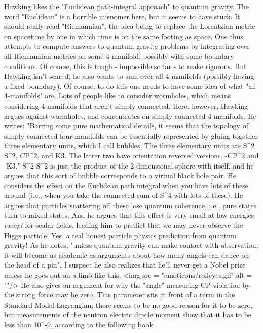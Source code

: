 Hawking likes the "Euclidean path-integral approach" to quantum
gravity.  The word "Euclidean" is a horrible misnomer here, but it
seems to have stuck.  It should really read "Riemannian", the idea
being to replace the Lorentzian metric on spacetime by one in which
time is on the same footing as space.  One thus attempts to compute
answers to quantum gravity problems by integrating over all Riemannian
metrics on some 4-manifold, possibly with some boundary conditions.
Of course, this is tough - impossible so far - to make rigorous.  But
Hawking isn't scared; he also wants to sum over all 4-manifolds
(possibly having a fixed boundary).  Of course, to do this one needs
to have some idea of what "all 4-manifolds" are.  Lots of people like
to consider wormholes, which means considering 4-manifolds that aren't
simply connected.  Here, however, Hawking argues against wormholes,
and concentrates on simply-connected 4-manifolds.  He writes: "Barring
some pure mathematical details, it seems that the topology of simply
connected four-manifolds can be essentially represented by gluing
together three elementary units, which I call bubbles.  The three
elementary units are S^{2} \times  S^{2},
CP^{2}, and K3.  The latter two have orientation reversed
versions, -CP^{2} and -K3."  S^{2} \times 
S^{2} is just the product of the 2-dimensional sphere with
itself, and he argues that this sort of bubble corresponds to a
virtual black hole pair.  He considers the effect on the Euclidean
path integral when you have lots of these around (i.e., when you take
the connected sum of S^{4} with lots of these).  He argues that
particles scattering off these lose quantum coherence, i.e., pure
states turn to mixed states.  And he argues that this effect is very
small at low energies \emph{except} for scalar fields, leading him
to predict that we may never observe the Higgs particle!  Yes, a real
honest particle physics prediction from quantum gravity!  As he notes,
"unless quantum gravity can make contact with observation, it will
become as academic as arguments about how many angels can dance on the
head of a pin".  I suspect he also realizes that he'll never get a
Nobel prize unless he goes out on a limb like this.  <img src =
"emoticons/rolleyes.gif" alt = ""/> He also gives an argument for why
the "\theta  angle" measuring CP violation by the strong force may be
zero.  This parameter sits in front of a term in the Standard Model
Lagrangian; there seems to be no good reason for it to be zero, but
measurements of the neutron electric dipole moment show that it has to
be less than 10^{-9}, according to the following book...

